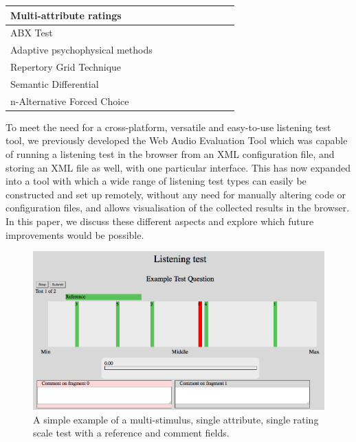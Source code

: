 \documentclass{sig-alternate}
\begin{document}
\begin{table}[ht]
\begin{center}
\begin{tabular}{|*{9}{l|}}
	    		 Multi-attribute ratings & & & \checkmark & & & & & \checkmark \\ \hline
	    		 ABX Test & & \checkmark & \checkmark & & & & & \checkmark \\ \hline
	    		 Adaptive psychophysical methods & & & & & & & \checkmark & \\ \hline 
	    		 Repertory Grid Technique & & & & & & & \checkmark & \\ \hline
	    		 Semantic Differential  & & & & & & \checkmark & \checkmark &\checkmark \\ \hline
	    		 n-Alternative Forced Choice & & & & & & \checkmark & & \\ \hline
	    	\end{tabular}
	 \end{center}
	 \vspace{-.5cm}
	 \label{tab:toolboxes}
	 \end{table}


    To meet the need for a cross-platform, versatile and easy-to-use listening test tool, we previously developed the Web Audio Evaluation Tool \cite{waet} which was capable of running a listening test in the browser from an XML configuration file, and storing an XML file as well, with one particular interface. This has now expanded into a tool with which a wide range of listening test types can easily be constructed and set up remotely, without any need for manually altering code or configuration files, and allows visualisation of the collected results in the browser. In this paper, we discuss these different aspects and explore which future improvements would be possible.

    \begin{figure}[tb]
    	\centering
    	\includegraphics[width=.5\textwidth]{interface.png}
    	\caption{A simple example of a multi-stimulus, single attribute, single rating scale test with a reference and comment fields.}
    	\label{fig:interface}
    \end{figure}
\end{document}
